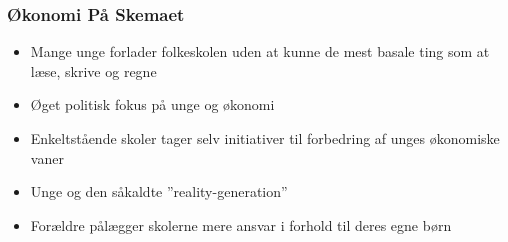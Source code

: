 
\begin{frame}
\frametitle{Økonomi På Skemaet}
    \begin{itemize}
        \item{Mange unge forlader folkeskolen uden at kunne de mest basale ting som at læse, skrive og regne}

        \item{Øget politisk fokus på unge og økonomi}

        \item{Enkeltstående skoler tager selv initiativer til forbedring af unges økonomiske vaner}

        \item{Unge og den såkaldte ''reality-generation''}

        \item{Forældre pålægger skolerne mere ansvar i forhold til deres egne børn}
    \end{itemize}
\end{frame}
    
